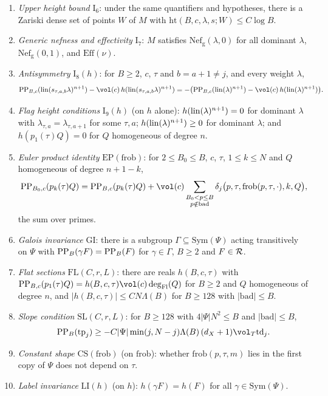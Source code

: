 \begin{definition}
\begin{enumerate}[label=(\arabic*)]
\item \emph{Upper height bound} $\mathrm{I}_6$: under the same quantifiers and hypotheses, there is a Zariski dense set of points $W$ of $M$
  with $\mathrm{ht}(B,c,\lambda,s;W)\le C\log B$.
\item \emph{Generic nefness and effectivity} $\mathrm{I}_7$: $M$ satisfies $\mathrm{Nef}_{\mathrm g}(\lambda,0)$ for all dominant $\lambda$,
  $\mathrm{Nef}_{\mathrm g}(0,1)$, and $\mathrm{Eff}(\nu)$.
\item \emph{Antisymmetry} $\mathrm{I}_8(h)$: for $B\ge2$, $c$, $\tau$ and $b=a+1\ne j$, and every weight $\lambda$,
  \begin{equation}\label{pf:volthm:eq:I8}
  \volthmPP_{B,c}(\volthmlin(s_{\tau,a,b}\lambda)^{n+1})-\vol(c)\,h(\volthmlin(s_{\tau,a,b}\lambda)^{n+1})=
  -\bigl(\volthmPP_{B,c}(\volthmlin(\lambda)^{n+1})-\vol(c)\,h(\volthmlin(\lambda)^{n+1})\bigr).
  \end{equation}
\item \emph{Flag height conditions} $\mathrm{I}_9(h)$ (on $h$ alone): $h(\mathrm{lin}(\lambda)^{n+1})=0$ for dominant $\lambda$
  with $\lambda_{\tau,a}=\lambda_{\tau,a+1}$ for some $\tau,a$; $h(\mathrm{lin}(\lambda)^{n+1})\ge0$ for dominant
  $\lambda$; and $h(p_1(\tau)Q)=0$ for $Q$ homogeneous of degree $n$.
\item \emph{Euler product identity} $\mathrm{EP}(\mathrm{frob})$: for $2\le B_0\le B$, $c$, $\tau$, $1\le k\le N$ and $Q$ homogeneous of
  degree $n+1-k$,
  \begin{equation}\label{pf:volthm:eq:prop6}
  \volthmPP_{B_0,c}(p_k(\tau)Q)=\volthmPP_{B,c}(p_k(\tau)Q)+\vol(c)\sum_{\substack{B_0<p\le B\\ p\notin\mathrm{bad}}}
  \delta_j\bigl(p,\tau,\mathrm{frob}(p,\tau,\cdot),k,Q\bigr),
  \end{equation}
  the sum over primes.
\item \emph{Galois invariance} $\mathrm{GI}$: there is a subgroup $\Gamma\subseteq\mathrm{Sym}(\Psi)$ acting transitively on $\Psi$
  with $\mathrm{PP}_B(\gamma F)=\mathrm{PP}_B(F)$ for $\gamma\in\Gamma$, $B\ge2$ and $F\in\mathcal{R}$.
\item \emph{Flat sections} $\mathrm{FL}(C,r,L)$: there are reals $h(B,c,\tau)$ with
  $\volthmPP_{B,c}(p_1(\tau)Q)=h(B,c,\tau)\vol(c)\volthmdeg(Q)$ for $B\ge2$ and $Q$ homogeneous of degree $n$,
  and $|h(B,c,\tau)|\le CN\Lambda(B)$ for $B\ge128$ with $|\mathrm{bad}|\le B$.
\item \emph{Slope condition} $\mathrm{SL}(C,r,L)$: for $B\ge128$ with $4|\Psi|N^2\le B$ and $|\mathrm{bad}|\le B$,
  \[
  \volthmPP_B(\mathrm{tp}_j)\ge-C|\Psi|\min(j,N-j)\Lambda(B)\,(d_X+1)\vol_T\mathrm{td}_j.
  \]
\item \emph{Constant shape} $\mathrm{CS}(\mathrm{frob})$ (on $\mathrm{frob}$): whether $\mathrm{frob}(p,\tau,m)$ lies in the first copy of $\Psi$
  does not depend on $\tau$.
\item \emph{Label invariance} $\mathrm{LI}(h)$ (on $h$): $h(\gamma F)=h(F)$ for all $\gamma\in\mathrm{Sym}(\Psi)$.
\end{enumerate}
\end{definition}

